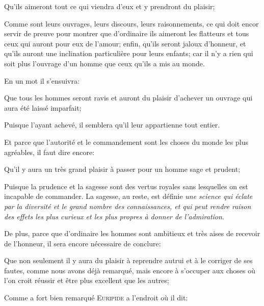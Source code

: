 \begin{lieu}
	Qu'ils aimeront tout ce qui viendra d'eux et y prendront du plaisir;
\end{lieu}

Comme sont leurs ouvrages, leurs discours, leurs raisonnements, ce qui doit encor servir de preuve pour montrer
que d'ordinaire ils aimeront les flatteurs et tous ceux qui auront pour eux de l'amour; enfin, qu'ils seront
jaloux d'honneur, et qu'ils auront une inclination particulière pour leurs enfants; car il n'y a rien qui soit
plus l'ouvrage d'un homme que ceux qu'ils a mis au monde.

\bigbreak

En un mot il s'ensuivra:

\begin{lieu}
	Que tous les hommes seront ravis et auront du plaisir d'achever un ouvrage qui aura été laissé imparfait;
\end{lieu}

Puisque l'ayant achevé, il semblera qu'il leur appartienne tout entier.

\bigbreak

Et parce que l'autorité et le commandement sont les choses du monde les plus agréables, il faut dire encore:

\begin{lieu}
	Qu'il y aura un très grand plaisir à passer pour un homme sage et prudent;
\end{lieu}

Puisque la prudence et la sagesse sont des vertus royales sans lesquelles on est incapable de commander.
La sagesse, au reste, est définie \emph{une science qui éclate par la diversité et le grand nombre des
connaissances, et qui peut rendre raison des effets les plus curieux et les plus propres à donner de
l'admiration}. 

\bigbreak

De plus, parce que d'ordinaire les hommes sont ambitieux et très aises de recevoir de l'honneur, il sera
encore nécessaire de conclure:

\begin{lieu}
	Que non seulement il y aura du plaisir à reprendre autrui et à le corriger de ses fautes, comme nous
	avons déjà remarqué, mais encore à s'occuper aux choses où l'on croit réussir et être plus excellent
	que les autres;
\end{lieu}

Comme a fort bien remarqué \textsc{Euripide} a l'endroit où il dit:

